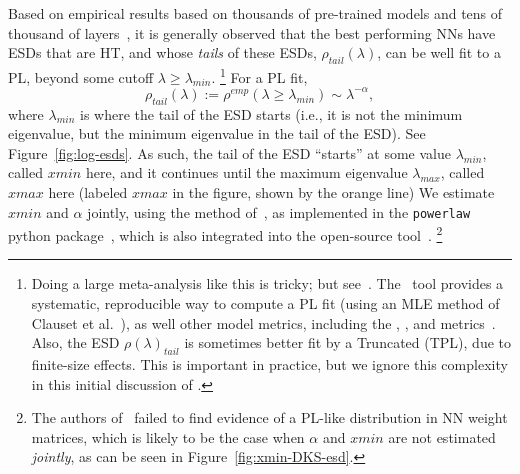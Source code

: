 Based on empirical results based on thousands of pre-trained models and tens of thousand of layers~\cite{MM18_TR_JMLRversion,MM20a_trends_NatComm,MM21a_simpsons_TR,YTHx23_KDD}, 
it is generally observed that the 
best performing NNs have ESDs that are HT, and whose \emph{tails} of these ESDs, $\rho_{tail}(\lambda)$, can be well fit to a PL, beyond some cutoff $\lambda\ge\lambda_{min}$.%
\footnote{Doing a large meta-analysis like this is tricky; but see~\cite{MM18_TR_JMLRversion,MM20a_trends_NatComm,MM21a_simpsons_TR,YTHx23_KDD}.  The \WW~tool provides a systematic, reproducible way to compute a PL fit (using an MLE method of Clauset et al.~\cite{CSN09_powerlaw}), as well other model metrics, including the \SPECTRALNORM, \RANDDIST, and \ALPHAHAT metrics~\cite{MM20a_trends_NatComm}.  Also, the ESD $\rho(\lambda)_{tail}$ is sometimes better fit by a Truncated \PowerLaw (TPL), due to finite-size effects. This is important in practice, but we ignore this complexity in this initial discussion of \SETOL.  }
For a PL fit,
\begin{equation}
\rho_{tail}(\lambda):=\rho^{emp}(\lambda\ge\lambda_{min})\sim\lambda^{-\alpha} ,
\label{eqn:rho_tail}
\end{equation}
where $\lambda_{min}$ is where the tail of the ESD starts (i.e., it is not the minimum eigenvalue, but the minimum eigenvalue in the tail of the ESD). 
See Figure~\ref{fig:log-esds}.
As such, the tail of the ESD ``starts'' at some value $\lambda_{min}$, called $xmin$ here, and it continues until the 
maximum eigenvalue $\lambda_{max}$, called $xmax$ here
(labeled $xmax$ in the figure, shown by the orange line)
We estimate $xmin$ and $\alpha$ jointly, using the method of~\cite{CSN09_powerlaw}, 
as implemented in the \texttt{powerlaw} python package~\cite{ABP14}, 
which is also integrated into the open-source \WW tool~\cite{MM20a_trends_NatComm, WW}.%
\footnote{The authors of~\cite{Thamm2022} failed to find evidence of a PL-like distribution in NN weight matrices, which is 
likely to be the case when $\alpha$ and $xmin$ are not estimated \emph{jointly}, as can be seen in Figure~\ref{fig:xmin-DKS-esd}.  }




